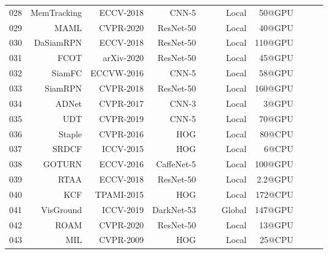 \documentclass[final]{cvpr}
\begin{document}
\begin{table*}[!htp]
\begin{tabular}{rrrrccrrccc}
028			&MemTracking \cite{Yang_2018_ECCV}					&ECCV-2018    	&CNN-5     			&\cmark     			&\cmark    	&Local    		 		&50@GPU    	 			&		 	\\
029			&MAML			 \cite{wang2020MAML}						&CVPR-2020    	&ResNet-50     	&\xmark     			&\cmark    	&Local    		 		&40@GPU    	 			&		 	\\
030			&DaSiamRPN	 \cite{zhu2018distractor}						&ECCV-2018    	&ResNet-50     	&\xmark     			&\cmark    	&Local    		 		&110@GPU    	 			&		 	\\
031			&FCOT			 \cite{cui2020FCOT}							&arXiv-2020    	&ResNet-50     	&\xmark     			&\cmark    	&Local    		 		&45@GPU    	 			&		 	\\
032			&SiamFC		 	 \cite{bertinetto2016siamfc}					&ECCVW-2016   &CNN-5     			&\xmark     			&\cmark    	&Local    		 		&58@GPU    	 			&		 	\\
033			&SiamRPN		 \cite{li2018siamRPN}							&CVPR-2018    	&ResNet-50     	&\xmark     			&\cmark    	&Local    		 		&160@GPU    	 			&		 	\\
034			&ADNet			 \cite{Yun2017ADNet}							&CVPR-2017    	&CNN-3     			&\cmark     			&\cmark    	&Local    		 		&3@GPU    	 				&		 	\\
035			&UDT				 \cite{wang2019UDT}							&CVPR-2019    	&CNN-5     			&\xmark     			&\cmark   	&Local    		 		&70@GPU    	 			&		 	\\
036			&Staple			 \cite{bertinetto2016staple}					&CVPR-2016    	&HOG     			&\cmark     			&\xmark    	&Local    		 		&80@CPU    	 			&		 	\\
037			&SRDCF		 	 \cite{danelljan2015srdcf}					&ICCV-2015    	&HOG     			&\cmark     			&\xmark    	&Local    		 		&6@CPU    	 				&		 	\\
038			&GOTURN		 \cite{held2016GOTURN}					&ECCV-2016    	&CaffeNet-5     	&\xmark     			&\cmark    	&Local    		 		&100@GPU    	 			&		 	\\
039			&RTAA			 \cite{jia2020TrackAttack}					&ECCV-2018    	&ResNet-50     	&\xmark     			&\cmark    	&Local    		 		&2.2@GPU    	 			&		 	\\
040			&KCF				 \cite{Henriques2015High}					&TPAMI-2015    	&HOG     			&\cmark     			&\xmark    	&Local    		 		&172@CPU    	 			&		 	\\
041			&VisGround	 \cite{yang2019fastgrounding}				&ICCV-2019    	&DarkNet-53     	&\xmark     			&\cmark    	&Global    		 	&147@GPU    	 			&		\\  
042			&ROAM			 \cite{yang2020roam}							&CVPR-2020    	&ResNet-50     	&\xmark     			&\cmark    	&Local    		 		&13@GPU    	 			&		 	\\
043			&MIL				 \cite{babenko2009MIL}						&CVPR-2009    	&HOG     			&\cmark     			&\xmark    	&Local    		 		&25@CPU   				&		 	\\
\hline \toprule [0.8 pt]
\end{tabular}
\end{table*} 
\end{document}
